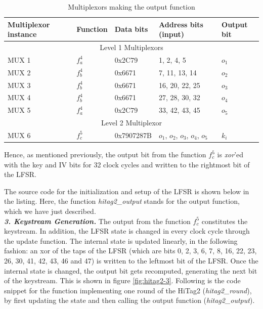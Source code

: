 \begin{table}[ht!]
\begin{center}
\small{
\begin{tabular}{|p{2.2cm}|l|p{2cm}|p{2.8cm}|p{1.5cm}|}
\hline
\textbf{Multiplexor instance}	& \textbf{Function}		& \textbf{Data bits}	& \textbf{Address bits (input)}		& \textbf{Output bit}\\ \hline
\multicolumn{5}{|c|}{Level 1 Multiplexors}\\ \hline
MUX 1 			&	$f_a^4$			& 0x2C79			& 1, 2, 4, 5							& $o_1$\\
MUX 2 			&	$f_b^4$			& 0x6671			& 7, 11, 13, 14						& $o_2$\\
MUX 3 			&	$f_b^4$			& 0x6671			& 16, 20, 22, 25					& $o_3$\\
MUX 4 			&	$f_b^4$			& 0x6671			& 27, 28, 30, 32					& $o_4$\\
MUX 5 			&	$f_a^4$			& 0x2C79			& 33, 42, 43, 45					& $o_5$\\ \hline
\multicolumn{5}{|c|}{Level 2 Multiplexor}\\ \hline
MUX 6 			&	$f_c^5$			& 0x7907287B	& $o_1$, $o_2$, $o_3$, $o_4$, $o_5$		& $k_i$\\ \hline
\end{tabular}}
\end{center}
\caption{Multiplexors making the output function}
\label{tab:muxs}
\end{table}

Hence, as mentioned previously, the output bit from the function $f_c^5$ is \emph{xor}'ed with the key and IV bits for 32 clock cycles and written to the rightmost bit of the LFSR.

The source code for the initialization and setup of the LFSR is shown below in the listing. Here, the function \emph{hitag2\_output} stands for the output function, which we have just described.\\



\textit{\textbf{3. Keystream Generation.}} The output from the function $f_c^5$ constitutes the keystream. In addition, the LFSR state is changed in every clock cycle through the update function. The internal state is updated linearly, in the following fashion: an xor of the taps of the LFSR (which are bits 0, 2, 3, 6, 7, 8, 16, 22, 23, 26, 30, 41, 42, 43, 46 and 47) is written to the leftmost bit of the LFSR. Once the internal state is changed, the output bit gets recomputed, generating the next bit of the keystream. This is shown in figure \ref{fig:hitag2-3}. Following is the code snippet for the function implementing one round of the HiTag2 (\emph{hitag2\_round}), by first updating the state and then calling the output function (\emph{hitag2\_output}).\\


